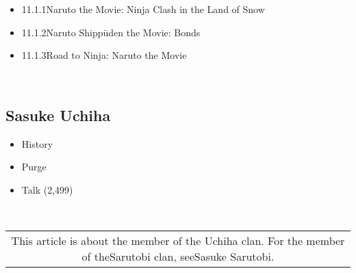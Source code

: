\documentclass[a4paper,12pt]{article}
\begin{document}
\begin{itemize}
\item 11.1.1Naruto the Movie: Ninja Clash in the Land of Snow
\item 11.1.2Naruto Shippūden the Movie: Bonds
\item 11.1.3Road to Ninja: Naruto the Movie
\end{itemize}\\ \par \vspace{0.5cm}

\subsection*{Sasuke Uchiha}\n\n\begin{itemize}
\item History
\item Purge
\item Talk (2,499)
\end{itemize}\\ \par \vspace{0.5cm}

\begin{tabular}{|c|} \hline
This article is about the member of the Uchiha clan. For the member of theSarutobi clan, seeSasuke Sarutobi. \\
\end{tabular}\\ \par \vspace{0.5cm}
\end{document}
